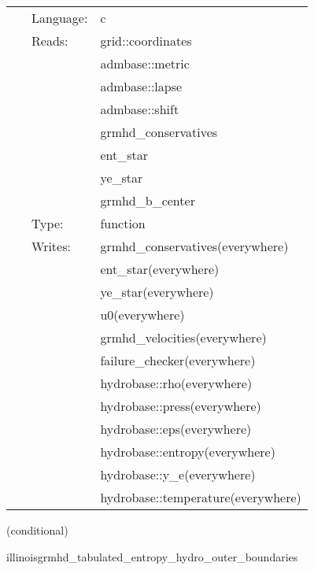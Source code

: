 \documentclass{article}
\begin{document}
 \begin{tabular*}{160mm}{cll} 
~ & Language:  & c \\ 
~ & Reads:  & grid::coordinates \\ 
~& ~ &admbase::metric\\ 
~& ~ &admbase::lapse\\ 
~& ~ &admbase::shift\\ 
~& ~ &grmhd\_conservatives\\ 
~& ~ &ent\_star\\ 
~& ~ &ye\_star\\ 
~& ~ &grmhd\_b\_center\\ 
~ & Type:  & function \\ 
~ & Writes:  & grmhd\_conservatives(everywhere) \\ 
~& ~ &ent\_star(everywhere)\\ 
~& ~ &ye\_star(everywhere)\\ 
~& ~ &u0(everywhere)\\ 
~& ~ &grmhd\_velocities(everywhere)\\ 
~& ~ &failure\_checker(everywhere)\\ 
~& ~ &hydrobase::rho(everywhere)\\ 
~& ~ &hydrobase::press(everywhere)\\ 
~& ~ &hydrobase::eps(everywhere)\\ 
~& ~ &hydrobase::entropy(everywhere)\\ 
~& ~ &hydrobase::y\_e(everywhere)\\ 
~& ~ &hydrobase::temperature(everywhere)\\ 
\end{tabular*} 


\vspace{5mm}

   (conditional) 

\hspace{5mm} illinoisgrmhd\_tabulated\_entropy\_hydro\_outer\_boundaries 

\hspace{5mm}{\it entropy+tabulated version of illinoisgrmhd\_outer\_boundaries } 


\hspace{5mm}
\end{document}
